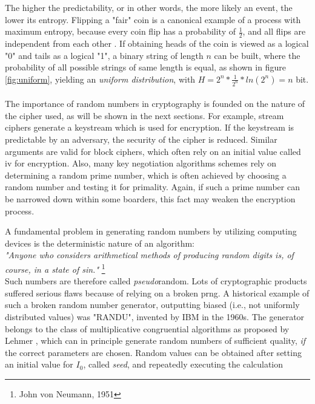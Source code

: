 The higher the predictability, or in other words, the more likely an event, the lower its entropy. Flipping a "fair" coin is a canonical 
example of a process with maximum entropy, because every coin flip has a probability of $\frac{1}{2}$, and all flips are independent from each other \cite{1621063}.
If obtaining heads of the coin is viewed as a logical "0" and tails as a logical "1", a binary string of length $n$ can be built, where the probability of all possible
strings of same length is equal, as shown in figure \ref{fig:uniform}, yielding an \textit{uniform distribution}, with
$H = 2^n*\frac{1}{2^n}*ln(2^n) = n$ bit. 
\\
\\
The importance of random numbers in cryptography is founded on the nature of the cipher used, as will be shown in the next sections. For example,
stream ciphers generate a keystream which is used
for encryption. If the keystream is predictable by an adversary, the security of the cipher is reduced. Similar arguments are valid for block ciphers, which often
rely on an initial value called \gls{iv} for encryption. Also, many key negotiation algorithms schemes rely on determining a random prime number, which is often 
achieved by choosing a random number and testing it for primality. Again, if such a prime number can be narrowed down within some boarders, this fact may
weaken the encryption process.

A fundamental problem in generating random numbers by utilizing computing devices is the deterministic nature of an algorithm:
\\

\textit{"Anyone who considers arithmetical methods of producing random digits is, of course, in a state of sin."} \footnote{John von Neumann, 1951}
\\

Such numbers are therefore called \textit{pseudo}random. Lots of cryptographic products suffered serious flaws because of relying on a broken \gls{prng}. A 
historical example of such a broken random number generator, outputting biased (i.e., not uniformly distributed values) was "RANDU", invented by IBM in the
1960s. 
The generator belongs to the class of multiplicative congruential algorithms as proposed by Lehmer \cite{MR0044899}, which can in principle generate random
numbers of sufficient quality, \textit{if} the correct parameters are chosen.
Random values can be obtained after setting an initial value for $I_0$, called \textit{seed}, and repeatedly executing the calculation

